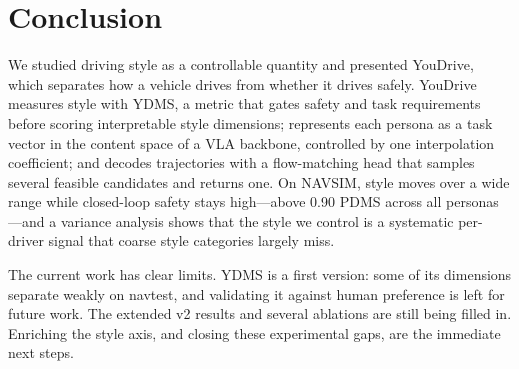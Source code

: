 \section{Conclusion}
\label{sec:conclusion}
We studied driving style as a controllable quantity and presented YouDrive, which
separates how a vehicle drives from whether it drives safely. YouDrive measures style
with YDMS, a metric that gates safety and task requirements before scoring
interpretable style dimensions; represents each persona as a task vector in the
content space of a VLA backbone, controlled by one interpolation coefficient; and
decodes trajectories with a flow-matching head that samples several feasible
candidates and returns one. On NAVSIM, style moves over a wide range while closed-loop
safety stays high---above 0.90 PDMS across all personas---and a variance analysis
shows that the style we control is a systematic per-driver signal that coarse style
categories largely miss.

The current work has clear limits. YDMS is a first version: some of its dimensions
separate weakly on navtest, and validating it against human preference is left for
future work. The extended v2 results and several ablations are still being filled in.
Enriching the style axis, and closing these experimental gaps, are the immediate next
steps.
